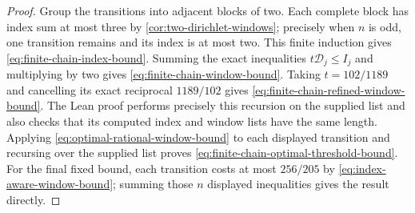 \documentclass[11pt]{article}
\begin{document}
\begin{proof}
Group the transitions into adjacent blocks of two.  Each complete block has
index sum at most three by \cref{cor:two-dirichlet-windows}; precisely when
$n$ is odd, one transition remains and its index is at most two.  This finite
induction gives
\eqref{eq:finite-chain-index-bound}.  Summing the exact inequalities
$t\mathcal D_j\le I_j$ and multiplying by two gives
\eqref{eq:finite-chain-window-bound}.  Taking $t=102/1189$ and cancelling its
exact reciprocal $1189/102$ gives
\eqref{eq:finite-chain-refined-window-bound}.  The Lean proof performs
precisely this recursion on the supplied list and also checks that its
computed index and window lists have the same length.  Applying
\eqref{eq:optimal-rational-window-bound} to each displayed transition and
recursing over the supplied list proves
\eqref{eq:finite-chain-optimal-threshold-bound}.  For the final fixed bound,
each transition costs at most $256/205$ by
\eqref{eq:index-aware-window-bound}; summing those $n$ displayed inequalities
gives the result directly.
\end{proof}
\end{document}
